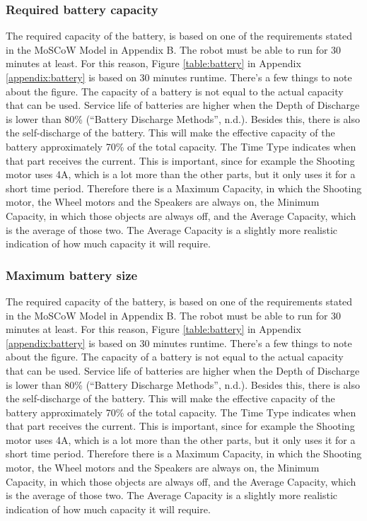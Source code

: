 \documentclass[11pt,twoside,a4paper]{report}
\begin{document}
\subsubsection{Required battery capacity}
The required capacity of the battery, is based on one of the requirements stated in the MoSCoW Model in Appendix B. The robot must be able to run for 30 minutes at least. For this reason, Figure \ref{table:battery} in Appendix \ref{appendix:battery} is based on 30 minutes runtime. 
There’s a few things to note about the figure. The capacity of a battery is not equal to the actual capacity that can be used. Service life of batteries are higher when the Depth of Discharge is lower than 80\% (“Battery Discharge Methods”, n.d.). Besides this, there is also the self-discharge of the battery. This will make the effective capacity of the battery approximately 70\% of the total capacity. 
The Time Type indicates when that part receives the current. This is important, since for example the Shooting motor uses 4A, which is a lot more than the other parts, but it only uses it for a short time period. Therefore there is a Maximum Capacity, in which the Shooting motor, the Wheel motors and the Speakers are always on, the Minimum Capacity, in which those objects are always off, and the Average Capacity, which is the average of those two. The Average Capacity is a slightly more realistic indication of how much capacity it will require. 
\subsubsection{Maximum battery size}
The required capacity of the battery, is based on one of the requirements stated in the MoSCoW Model in Appendix B. The robot must be able to run for 30 minutes at least. For this reason, Figure \ref{table:battery} in Appendix \ref{appendix:battery} is based on 30 minutes runtime. 
There’s a few things to note about the figure. The capacity of a battery is not equal to the actual capacity that can be used. Service life of batteries are higher when the Depth of Discharge is lower than 80\% (“Battery Discharge Methods”, n.d.). Besides this, there is also the self-discharge of the battery. This will make the effective capacity of the battery approximately 70\% of the total capacity. 
The Time Type indicates when that part receives the current. This is important, since for example the Shooting motor uses 4A, which is a lot more than the other parts, but it only uses it for a short time period. Therefore there is a Maximum Capacity, in which the Shooting motor, the Wheel motors and the Speakers are always on, the Minimum Capacity, in which those objects are always off, and the Average Capacity, which is the average of those two. The Average Capacity is a slightly more realistic indication of how much capacity it will require.
\end{document}
